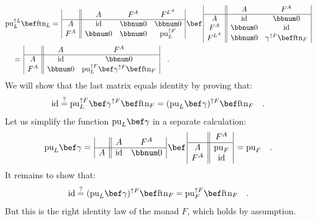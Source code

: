 \begin{align*}
 & \text{pu}_{L}^{\uparrow L}\bef\text{ftn}_{L}=\,\begin{array}{|c||ccc|}
 & A & F^{A} & F^{L^{A}}\\
\hline A & \text{id} & \bbnum 0 & \bbnum 0\\
F^{A} & \bbnum 0 & \bbnum 0 & \text{pu}_{L}^{\uparrow F}
\end{array}\,\bef\,\begin{array}{|c||cc|}
 & A & F^{A}\\
\hline A & \text{id} & \bbnum 0\\
F^{A} & \bbnum 0 & \text{id}\\
F^{L^{A}} & \bbnum 0 & \gamma^{\uparrow F}\bef\text{ftn}_{F}
\end{array}\\
 & \quad=\,\begin{array}{|c||cc|}
 & A & F^{A}\\
\hline A & \text{id} & \bbnum 0\\
F^{A} & \bbnum 0 & \text{pu}_{L}^{\uparrow F}\bef\gamma^{\uparrow F}\bef\text{ftn}_{F}
\end{array}\quad.
\end{align*}
We will show that the last matrix equals identity by proving that:
\[
\text{id}\overset{?}{=}\text{pu}_{L}^{\uparrow F}\bef\gamma^{\uparrow F}\bef\text{ftn}_{F}=(\text{pu}_{L}\bef\gamma)^{\uparrow F}\bef\text{ftn}_{F}\quad.
\]
Let us simplify the function $\text{pu}_{L}\bef\gamma$ in a separate
calculation:
\[
\text{pu}_{L}\bef\gamma=\,\begin{array}{|c||cc|}
 & A & F^{A}\\
\hline A & \text{id} & \bbnum 0
\end{array}\,\bef\,\begin{array}{|c||c|}
 & F^{A}\\
\hline A & \text{pu}_{F}\\
F^{A} & \text{id}
\end{array}\,=\text{pu}_{F}\quad.
\]
It remains to show that:
\[
\text{id}\overset{?}{=}(\text{pu}_{L}\bef\gamma)^{\uparrow F}\bef\text{ftn}_{F}=\text{pu}_{F}^{\uparrow F}\bef\text{ftn}_{F}\quad.
\]
But this is the right identity law of the monad $F$, which holds
by assumption. 

